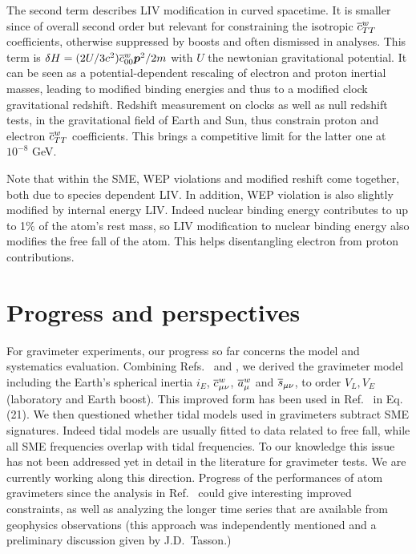 \documentclass{ws-procs9x6-cpt16}
\begin{document}
The second term describes LIV modification in curved spacetime.  It is
smaller since of overall second order but
relevant for constraining the isotropic $\overline{c}^w_{TT}$
coefficients, otherwise suppressed by boosts and often dismissed in
analyses. This term is $\delta H=(2U/3c^2)\overline{c}^w_{00}\mbox{\boldmath$p$}^2/2m$
with $U$ the newtonian gravitational potential.
It can be seen as a potential-dependent rescaling of electron
and proton inertial masses, leading to modified binding energies and thus to a modified
clock gravitational redshift. Redshift measurement on
clocks as well as
null redshift tests, in the gravitational field of Earth
and Sun, thus
constrain proton and electron $\overline{c}^w_{TT}$
coefficients.\cite{Kostelecky2011,Hohensee2011} This brings a competitive limit for the latter one at $10^{-8}$ GeV.\cite{Hohensee2013}

Note that within the SME, WEP
violations and modified reshift come together,
both due to species dependent LIV. In addition, WEP violation is also
slightly modified by internal energy LIV. Indeed nuclear binding energy
contributes to up to 1$\%$
of the atom's rest mass, so LIV modification to nuclear binding energy
also modifies the
free fall of the atom.\cite{Hohensee2011,Hohensee2013a} 
This helps disentangling electron from
proton contributions.

\section{Progress and perspectives}\label{sec4}
For gravimeter experiments, 
our progress so far concerns the model and
systematics evaluation. 
Combining Refs.\  and , 
we derived the
gravimeter model including the Earth's spherical inertia $i_E$,
$\overline{c}^w_{{\mu\nu}}$, $\overline{a}^w_{\mu}$ and $\overline{s}_{{\mu\nu}}$, to order $V_L,V_E$ (laboratory
and Earth boost). This improved form has been used
in Ref.\  in Eq. (21). 
We then questioned whether tidal models used in
gravimeters subtract SME
signatures. Indeed tidal models are usually fitted to data related to
free fall, while all SME frequencies overlap with tidal frequencies.\cite{Tamura1987}  To our knowledge this issue has not 
been addressed yet in detail in the literature for gravimeter tests. We are currently working along 
this direction.
Progress of the performances of atom gravimeters since the analysis in Ref.~ could give interesting improved constraints, as well as analyzing the longer time
series that are available from geophysics observations (this approach was
independently mentioned and a preliminary discussion
given by J.D.\ Tasson.\cite{Tasson2016})
\end{document}
